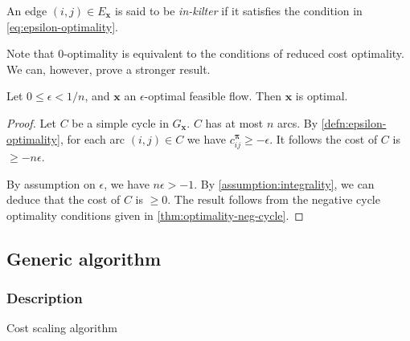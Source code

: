 \begin{defn} 
An edge $(i,j) \in E_{\mathbf{x}}$ is said to be \emph{in-kilter} if it satisfies the condition in \cref{eq:epsilon-optimality}.\\
\end{defn}

\begin{remark}
Note that $0$-optimality is equivalent to the conditions of reduced cost optimality. We can, however, prove a stronger result.\\
\end{remark}

\begin{thm}
Let $0 \leq \epsilon < 1/n$, and $\mathbf{x}$ an $\epsilon$-optimal feasible flow. Then $\mathbf{x}$ is optimal.
\end{thm}
\begin{proof}
Let $C$ be a simple cycle in $G_\mathbf{x}$. $C$ has at most $n$ arcs. By \cref{defn:epsilon-optimality}, for each arc $(i,j) \in C$ we have $c^{\boldsymbol{\pi}}_{ij} \geq -\epsilon$. It follows the cost of $C$ is $\geq -n\epsilon$.

By assumption on $\epsilon$, we have $n\epsilon > -1$. By \cref{assumption:integrality}, we can deduce that the cost of $C$ is $\geq 0$. The result follows from the negative cycle optimality conditions given in \cref{thm:optimality-neg-cycle}.
\end{proof}

\subsection{Generic algorithm}


\subsubsection{Description}


\begin{algorithm}
\begin{algorithmic}[1]
     
     
     
        \State {}
    \EndWhile
\end{algorithmic}
\caption{Cost scaling algorithm}
\label{algo:cost-scaling}
\end{algorithm}

